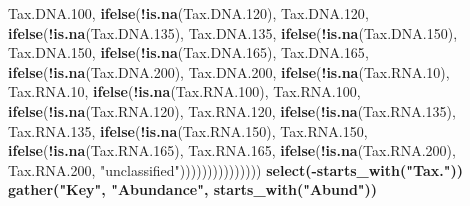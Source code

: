 \documentclass[11 pt,]{article}
\newenvironment{Shaded}{\begin{snugshade}}{\end{snugshade}}
\newcommand{\KeywordTok}[1]{\textcolor[rgb]{0.13,0.29,0.53}{\textbf{#1}}}
\newcommand{\DecValTok}[1]{\textcolor[rgb]{0.00,0.00,0.81}{#1}}
\newcommand{\StringTok}[1]{\textcolor[rgb]{0.31,0.60,0.02}{#1}}
\newcommand{\CommentTok}[1]{\textcolor[rgb]{0.56,0.35,0.01}{\textit{#1}}}
\newcommand{\OperatorTok}[1]{\textcolor[rgb]{0.81,0.36,0.00}{\textbf{#1}}}
\newcommand{\NormalTok}[1]{#1}
\begin{document}
\begin{Shaded}
\begin{Highlighting}[]
{{{{{{{{\NormalTok{    Tax.DNA.}\DecValTok{100}\NormalTok{, }\KeywordTok{ifelse}\NormalTok{(}\OperatorTok{!}\KeywordTok{is.na}\NormalTok{(Tax.DNA.}\DecValTok{120}\NormalTok{), Tax.DNA.}\DecValTok{120}\NormalTok{, }\KeywordTok{ifelse}\NormalTok{(}\OperatorTok{!}\KeywordTok{is.na}\NormalTok{(Tax.DNA.}\DecValTok{135}\NormalTok{), }
\NormalTok{        Tax.DNA.}\DecValTok{135}\NormalTok{, }\KeywordTok{ifelse}\NormalTok{(}\OperatorTok{!}\KeywordTok{is.na}\NormalTok{(Tax.DNA.}\DecValTok{150}\NormalTok{), Tax.DNA.}\DecValTok{150}\NormalTok{, }\KeywordTok{ifelse}\NormalTok{(}\OperatorTok{!}\KeywordTok{is.na}\NormalTok{(Tax.DNA.}\DecValTok{165}\NormalTok{), }
\NormalTok{            Tax.DNA.}\DecValTok{165}\NormalTok{, }\KeywordTok{ifelse}\NormalTok{(}\OperatorTok{!}\KeywordTok{is.na}\NormalTok{(Tax.DNA.}\DecValTok{200}\NormalTok{), Tax.DNA.}\DecValTok{200}\NormalTok{, }\KeywordTok{ifelse}\NormalTok{(}\OperatorTok{!}\KeywordTok{is.na}\NormalTok{(Tax.RNA.}\DecValTok{10}\NormalTok{), }
\NormalTok{                Tax.RNA.}\DecValTok{10}\NormalTok{, }\KeywordTok{ifelse}\NormalTok{(}\OperatorTok{!}\KeywordTok{is.na}\NormalTok{(Tax.RNA.}\DecValTok{100}\NormalTok{), Tax.RNA.}\DecValTok{100}\NormalTok{, }\KeywordTok{ifelse}\NormalTok{(}\OperatorTok{!}\KeywordTok{is.na}\NormalTok{(Tax.RNA.}\DecValTok{120}\NormalTok{), }
\NormalTok{                  Tax.RNA.}\DecValTok{120}\NormalTok{, }\KeywordTok{ifelse}\NormalTok{(}\OperatorTok{!}\KeywordTok{is.na}\NormalTok{(Tax.RNA.}\DecValTok{135}\NormalTok{), Tax.RNA.}\DecValTok{135}\NormalTok{, }\KeywordTok{ifelse}\NormalTok{(}\OperatorTok{!}\KeywordTok{is.na}\NormalTok{(Tax.RNA.}\DecValTok{150}\NormalTok{), }
\NormalTok{                    Tax.RNA.}\DecValTok{150}\NormalTok{, }\KeywordTok{ifelse}\NormalTok{(}\OperatorTok{!}\KeywordTok{is.na}\NormalTok{(Tax.RNA.}\DecValTok{165}\NormalTok{), Tax.RNA.}\DecValTok{165}\NormalTok{, }\KeywordTok{ifelse}\NormalTok{(}\OperatorTok{!}\KeywordTok{is.na}\NormalTok{(Tax.RNA.}\DecValTok{200}\NormalTok{), }
\NormalTok{                      Tax.RNA.}\DecValTok{200}\NormalTok{, }\StringTok{"unclassified"}\NormalTok{))))))))))))))) }\OperatorTok{%
\KeywordTok{select}\NormalTok{(}\OperatorTok{-}\KeywordTok{starts_with}\NormalTok{(}\StringTok{"Tax."}\NormalTok{)) }\OperatorTok{%
\KeywordTok{gather}\NormalTok{(}\StringTok{"Key"}\NormalTok{, }\StringTok{"Abundance"}\NormalTok{, }\KeywordTok{starts_with}\NormalTok{(}\StringTok{"Abund"}\NormalTok{)) }\OperatorTok{%
}}}}}}}}}}}
\end{Highlighting}
\end{Shaded}
\end{document}
